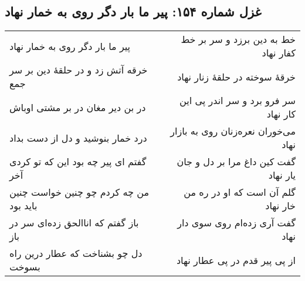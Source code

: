 \begin{center}
\section*{غزل شماره ۱۵۴: پیر ما بار دگر روی به خمار نهاد}
\label{sec:154}
\begin{longtable}{l p{0.5cm} r}
پیر ما بار دگر روی به خمار نهاد
&&
خط به دین برزد و سر بر خط کفار نهاد
\\
خرقه آتش زد و در حلقهٔ دین بر سر جمع
&&
خرقهٔ سوخته در حلقهٔ زنار نهاد
\\
در بن دیر مغان در بر مشتی اوباش
&&
سر فرو برد و سر اندر پی این کار نهاد
\\
درد خمار بنوشید و دل از دست بداد
&&
می‌خوران نعره‌زنان روی به بازار نهاد
\\
گفتم ای پیر چه بود این که تو کردی آخر
&&
گفت کین داغ مرا بر دل و جان یار نهاد
\\
من چه کردم چو چنین خواست چنین باید بود
&&
گلم آن است که او در ره من خار نهاد
\\
باز گفتم که اناالحق زده‌ای سر در باز
&&
گفت آری زده‌ام روی سوی دار نهاد
\\
دل چو بشناخت که عطار درین راه بسوخت
&&
از پی پیر قدم در پی عطار نهاد
\\
\end{longtable}
\end{center}
